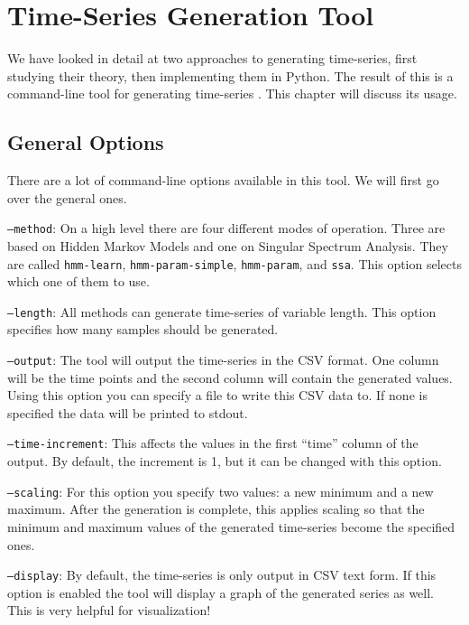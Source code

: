 \chapter{Time-Series Generation Tool}\label{chapter:tool}

We have looked in detail at two approaches to generating time-series, first studying their theory, then implementing them in Python. The result of this is a command-line tool for generating time-series \parencite{tsgenerator}. This chapter will discuss its usage. 

\section{General Options}

There are a lot of command-line options available in this tool. We will first go over the general ones. 

\texttt{---method}: On a high level there are four different modes of operation. Three are based on Hidden Markov Models and one on Singular Spectrum Analysis. They are called \texttt{hmm-learn}, \texttt{hmm-param-simple}, \texttt{hmm-param}, and \texttt{ssa}. This option selects which one of them to use. 

\texttt{---length}: All methods can generate time-series of variable length. This option specifies how many samples should be generated. 

\texttt{---output}: The tool will output the time-series in the CSV format. One column will be the time points and the second column will contain the generated values. Using this option you can specify a file to write this CSV data to. If none is specified the data will be printed to stdout. 

\texttt{---time-increment}: This affects the values in the first ``time'' column of the output. By default, the increment is 1, but it can be changed with this option. 

\texttt{---scaling}: For this option you specify two values: a new minimum and a new maximum. After the generation is complete, this applies scaling so that the minimum and maximum values of the generated time-series become the specified ones. 

\texttt{---display}: By default, the time-series is only output in CSV text form. If this option is enabled the tool will display a graph of the generated series as well. This is very helpful for visualization!

